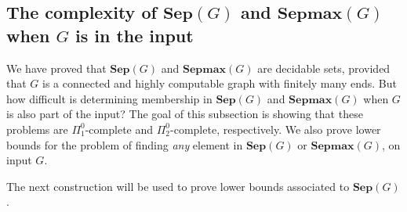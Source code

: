 \documentclass[10pt,A4]{amsart}
\theoremstyle{definition}
\theoremstyle{definition}
\newcommand{\sep}[1]{\mathbf{Sep}({#1})}
\newcommand{\sepmax}[1]{\mathbf{Sepmax}({#1})}
\begin{document}
\subsection{The complexity of $\sep{G}$ and  $\sepmax{G}$ when $G$ is in the input}\label{sec:uniform-sep-ends-and-sepmax}
We have proved that $\sep{G}$ and $\sepmax{G}$ are decidable sets, provided that $G$ is a connected and highly computable graph with finitely many ends. But how difficult is determining membership in $\sep{G}$ and $\sepmax{G}$ when $G$ is also part of the input? The goal of this subsection is showing that these  problems are $\Pi_1^0$-complete and $\Pi_2^0$-complete, respectively. We also prove lower bounds for the problem of finding \textit{any} element in $\sep{G}$ or $\sepmax{G}$, on input $G$. 

The next construction will be used to prove lower bounds associated to $\sep{G}$. 
\end{document}
